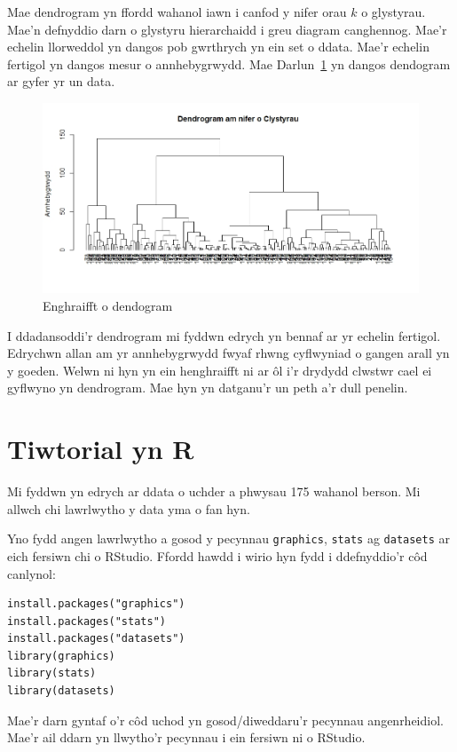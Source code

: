 Mae dendrogram yn ffordd wahanol iawn i canfod y nifer orau $k$ o glystyrau. Mae'n defnyddio darn o glystyru hierarchaidd i greu diagram canghennog. Mae'r echelin llorweddol yn dangos pob gwrthrych yn ein set o ddata. Mae'r echelin fertigol yn dangos mesur o annhebygrwydd. Mae Darlun~\ref{fig:dendogram} yn dangos dendogram ar gyfer yr un data.

\begin{figure}[H]
\begin{center}
\includegraphics[width=0.5\linewidth]{../img/Dendrogram.jpeg}
\end{center}
\caption{Enghraifft o dendogram}
\label{fig:dendogram}
\end{figure}

I ddadansoddi'r dendrogram mi fyddwn edrych yn bennaf ar yr echelin fertigol. Edrychwn allan am yr annhebygrwydd fwyaf rhwng cyflwyniad o gangen arall yn y goeden. Welwn ni hyn yn ein henghraifft ni ar ôl i'r drydydd clwstwr cael ei gyflwyno yn dendrogram. Mae hyn yn datganu'r un peth a'r dull penelin.

\section{Tiwtorial yn R}
Mi fyddwn yn edrych ar ddata o uchder a phwysau 175 wahanol berson. Mi allwch chi lawrlwytho y data yma o fan hyn. %

Yno fydd angen lawrlwytho a gosod y pecynnau \texttt{graphics}, \texttt{stats} ag \texttt{datasets} ar eich fersiwn chi o RStudio. Ffordd hawdd i wirio hyn fydd i ddefnyddio'r c\^{o}d canlynol: %

\begin{verbatim}
install.packages("graphics")
install.packages("stats")
install.packages("datasets")
library(graphics)
library(stats)
library(datasets)
\end{verbatim}

Mae'r darn gyntaf o'r c\^{o}d uchod yn gosod/diweddaru'r pecynnau angenrheidiol. Mae'r ail ddarn yn llwytho'r pecynnau i ein fersiwn ni o RStudio.

